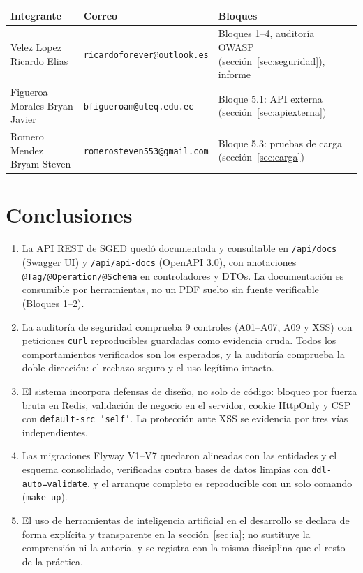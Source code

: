 \documentclass[11pt,a4paper]{article}
\begin{document}
\begin{center}
\begin{tabular}{@{}lll@{}}
\toprule
\textbf{Integrante} & \textbf{Correo} & \textbf{Bloques} \\
\midrule
Velez Lopez Ricardo Elias & \texttt{ricardoforever@outlook.es} & Bloques 1--4, auditoría OWASP (sección~\ref{sec:seguridad}), informe \\
Figueroa Morales Bryan Javier & \texttt{bfigueroam@uteq.edu.ec} & Bloque 5.1: API externa (sección~\ref{sec:apiexterna}) \\
Romero Mendez Bryam Steven & \texttt{romerosteven553@gmail.com}& Bloque 5.3: pruebas de carga (sección~\ref{sec:carga}) \\
\bottomrule
\end{tabular}
\end{center}

\section{Conclusiones}

\begin{enumerate}[leftmargin=*]
  \item La API REST de SGED quedó documentada y consultable en
    \texttt{/api/docs} (Swagger UI) y \texttt{/api/api-docs} (OpenAPI 3.0),
    con anotaciones \texttt{@Tag/@Operation/@Schema} en controladores y DTOs.
    La documentación es consumible por herramientas, no un PDF suelto sin
    fuente verificable (Bloques 1--2).

  \item La auditoría de seguridad comprueba 9 controles (A01--A07, A09 y XSS)
    con peticiones \texttt{curl} reproducibles guardadas como evidencia
    cruda. Todos los comportamientos verificados son los esperados, y la
    auditoría comprueba la doble dirección: el rechazo seguro y el uso
    legítimo intacto.

  \item El sistema incorpora defensas de diseño, no solo de código: bloqueo
    por fuerza bruta en Redis, validación de negocio en el servidor, cookie
    HttpOnly y CSP con \texttt{default-src 'self'}. La protección ante XSS se
    evidencia por tres vías independientes.

  \item Las migraciones Flyway V1--V7 quedaron alineadas con las entidades y
    el esquema consolidado, verificadas contra bases de datos limpias con
    \texttt{ddl-auto=validate}, y el arranque completo es reproducible con un
    solo comando (\texttt{make up}).

  \item El uso de herramientas de inteligencia artificial en el desarrollo se
    declara de forma explícita y transparente en la
    sección~\ref{sec:ia}; no sustituye la comprensión ni la autoría, y se
    registra con la misma disciplina que el resto de la práctica.
\end{enumerate}
\end{document}
